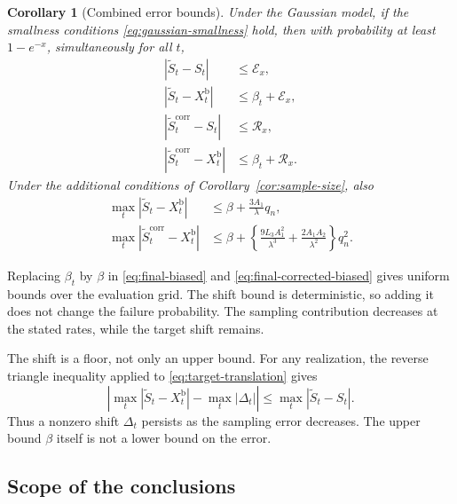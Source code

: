 \documentclass[11pt]{article}
\newcommand{\BiasedSignal}{X^{\mathrm b}}
\newcommand{\IMFs}{S}
\newcommand{\IMFt}{\widetilde S}
\newtheorem{corollary}[proposition]{Corollary}
\theoremstyle{definition}
\begin{document}
\begin{corollary}[Combined error bounds]\label{cor:biased}
Under the Gaussian model, if the smallness conditions
\eqref{eq:gaussian-smallness} hold, then with probability at least
\(1-e^{-x}\), simultaneously for all \(t\),
\begin{align}
  |\IMFt_t-\IMFs_t|&\leq\mathcal E_x,
    \label{eq:final-population}\\
  |\IMFt_t-\BiasedSignal_t|&\leq\beta_t+\mathcal E_x,
    \label{eq:final-biased}\\
  |\IMFt_t^{\mathrm{corr}}-\IMFs_t|&\leq\mathcal R_x,
    \label{eq:final-corrected-population}\\
  |\IMFt_t^{\mathrm{corr}}-\BiasedSignal_t|&\leq\beta_t+\mathcal R_x.
    \label{eq:final-corrected-biased}
\end{align}
Under the additional conditions of Corollary~\ref{cor:sample-size}, also
\begin{align}
  \max_t|\IMFt_t-\BiasedSignal_t|
    &\leq\beta+\frac{3A_1}{\lambda}q_n,
      \label{eq:biased-rate}\\
  \max_t|\IMFt_t^{\mathrm{corr}}-\BiasedSignal_t|
    &\leq\beta+\left\{\frac{9L_3A_1^2}{\lambda^3}
                 +\frac{2A_1A_2}{\lambda^2}\right\}q_n^2.
      \label{eq:corrected-biased-rate}
\end{align}
\end{corollary}

Replacing \(\beta_t\) by \(\beta\) in
\eqref{eq:final-biased} and \eqref{eq:final-corrected-biased} gives uniform
bounds over the evaluation grid.  The shift bound is deterministic, so adding
it does not change the failure probability.  The sampling contribution
decreases at the stated rates, while the target shift remains.

The shift is a floor, not only an upper bound.  For any realization, the
reverse triangle inequality applied to \eqref{eq:target-translation} gives
\begin{equation}
 \left|\max_t|\IMFt_t-\BiasedSignal_t|-\max_t|\Delta_t|\right|
 \leq\max_t|\IMFt_t-\IMFs_t|.
 \label{eq:error-floor}
\end{equation}
Thus a nonzero shift \(\Delta_t\) persists as the sampling error decreases.
The upper bound \(\beta\) itself is not a lower bound on the error.

\subsection{Scope of the conclusions}\label{sec:scope}
\end{document}
